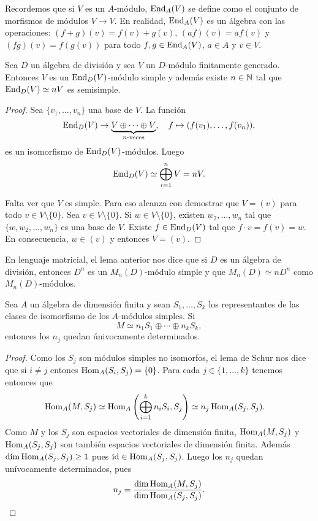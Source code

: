 \medskip
Recordemos que si $V$ es un $A$-módulo, $\operatorname{End}_A(V)$ se define como el 
conjunto de morfismos de módulos $V\to V$. En realidad, 
$\operatorname{End}_A(V)$ es un álgebra con las operaciones: $(f+g)(v)=f(v)+g(v)$, 
$(af)(v)=af(v)$ y $(fg)(v)=f(g(v))$ para todo $f,g\in\operatorname{End}_A(V)$, $a\in A$ y $v\in V$. 

\begin{lemma}
	Sea $D$ un álgebra de división y sea $V$ un $D$-módulo finitamente generado. Entonces
	$V$ es un $\operatorname{End}_D(V)$-módulo simple y además existe $n\in\mathbb{N}$ tal que 
	$\operatorname{End}_D(V)\simeq nV$ es semisimple.
\end{lemma}

\begin{proof}
	Sea $\{v_1,\dots,v_n\}$ una base de $V$. La función
	\[
		\operatorname{End}_D(V)\to \underbrace{V\oplus\cdots\oplus V}_{\text{$n$-veces}},\quad
		f\mapsto (f(v_1),\dots,f(v_n)),
	\]
	es un isomorfismo de $\operatorname{End}_D(V)$-módulos. Luego 
	\[
		\operatorname{End}_D(V)\simeq \bigoplus_{i=1}^n V=nV.
	\]
	
	Falta ver que $V$ es simple. Para eso alcanza con demostrar que $V=(v)$ 
	para todo $v\in V\setminus\{0\}$. Sea $v\in V\setminus\{0\}$. 
	Si $w\in V\setminus\{0\}$, existen $w_2,\dots,w_n$ tal que $\{w,w_2,\dots,w_n\}$ 
	es una base de $V$. Existe $f\in\operatorname{End}_D(V)$ tal que
	$f\cdot v=f(v)=w$. En consecuencia, $w\in (v)$ y entonces $V=(v)$.  
\end{proof}

En lenguaje matricial, el lema anterior nos dice que si $D$ es un álgebra de división, entonces 
$D^{n}$ es un $M_n(D)$-módulo simple y que $M_n(D)\simeq n D^n$ como $M_n(D)$-módulos. 

\begin{theorem}
Sea $A$ un álgebra de dimensión finita y sean 
$S_1,\dots,S_k$ los representantes de las clases de isomorfismo de los $A$-módulos simples. 
Si \[
M\simeq n_1S_1\oplus\cdots\oplus n_kS_k,
\]
entonces
los $n_j$ quedan únivocamente determinados. 
\end{theorem}

\begin{proof}
	Como los $S_j$ son módulos simples no isomorfos, 
	el lema de Schur nos dice que si $i\ne j$ entones $\operatorname{Hom}_A(S_i,S_j)=\{0\}$.
	Para cada $j\in\{1,\dots,k\}$ tenemos entonces que  
	\begin{align*}
		\operatorname{Hom}_A(M,S_j) &\simeq \operatorname{Hom}_A\left(\bigoplus_{i=1}^k n_i S_i,S_j\right)
		\simeq n_j\operatorname{Hom}_A(S_j,S_j). 
	\end{align*} 
	Como $M$ y los $S_j$ son espacios vectoriales de dimensión finita, $\operatorname{Hom}_A(M,S_j)$ y $\operatorname{Hom}_A(S_j,S_j)$ 
	son también espacios vectoriales de dimensión finita. 
	Además $\dim\operatorname{Hom}_A(S_j,S_j)\geq 1$ pues $\operatorname{id}\in\operatorname{Hom}_A(S_j,S_j)$. 
	Luego los $n_j$ quedan unívocamente determinados, pues 
	\[ 
	n_j=\frac{\dim\operatorname{Hom}_A(M,S_j)}{\dim\operatorname{Hom}_A(S_j,S_j)}.\qedhere
	\]
\end{proof}

